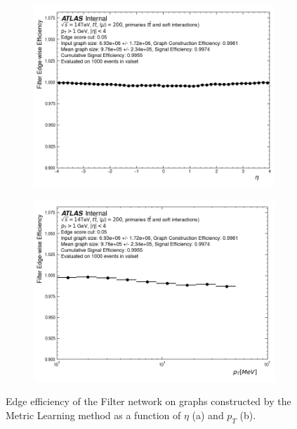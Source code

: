 \begin{figure}[h!]
\begin{subfigure}{0.49\textwidth}
    \centering
    \includegraphics[width=\textwidth]{figures/filter/edgewise_efficiency_with_radius_edgesplits_edgecut_5_eta.png}
    \caption{}
    \label{subfig:filter-eff-eta}
\end{subfigure}
\begin{subfigure}{0.49\textwidth}
    \centering
    \includegraphics[width=\textwidth]{figures/filter/edgewise_efficiency_with_radius_edgesplits_edgecut_5_pt.png}
    \caption{}
    \label{subfig:filter-eff-pt}
\end{subfigure}
    \caption{Edge efficiency of the Filter network on graphs constructed by the Metric Learning method as a function of $\eta$ (a) and $p_T$ (b).}
    \label{fig:filter-eff-pur-pt-eta}
\end{figure}

